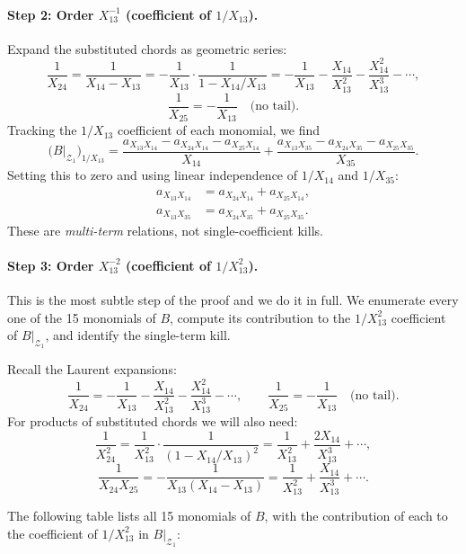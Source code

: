 \documentclass[11pt]{article}
\newcommand{\X}[2]{X_{#1#2}}
\newcommand{\Z}{\mathcal{Z}}
\theoremstyle{definition}
\begin{document}
\paragraph{Step 2: Order $\X{1}{3}^{-1}$ (coefficient of $1/\X{1}{3}$).}

Expand the substituted chords as geometric series:
\[
\frac{1}{\X{2}{4}}
=\frac{1}{\X{1}{4}-\X{1}{3}}
=-\frac{1}{\X{1}{3}}\cdot\frac{1}{1-\X{1}{4}/\X{1}{3}}
=-\frac{1}{\X{1}{3}}-\frac{\X{1}{4}}{\X{1}{3}^2}-\frac{\X{1}{4}^2}{\X{1}{3}^3}-\cdots,
\]
\[
\frac{1}{\X{2}{5}}=-\frac{1}{\X{1}{3}}\quad\text{(no tail).}
\]
Tracking the $1/\X{1}{3}$ coefficient of each monomial, we find
\[
\bigl(B|_{\Z_1}\bigr)_{1/\X{1}{3}}
=
\frac{a_{\X{1}{3}\X{1}{4}}-a_{\X{2}{4}\X{1}{4}}-a_{\X{2}{5}\X{1}{4}}}{\X{1}{4}}
+\frac{a_{\X{1}{3}\X{3}{5}}-a_{\X{2}{4}\X{3}{5}}-a_{\X{2}{5}\X{3}{5}}}{\X{3}{5}}.
\]
Setting this to zero and using linear independence of $1/\X{1}{4}$ and
$1/\X{3}{5}$:
\begin{align*}
a_{\X{1}{3}\X{1}{4}}&=a_{\X{2}{4}\X{1}{4}}+a_{\X{2}{5}\X{1}{4}},\\
a_{\X{1}{3}\X{3}{5}}&=a_{\X{2}{4}\X{3}{5}}+a_{\X{2}{5}\X{3}{5}}.
\end{align*}
These are \emph{multi-term} relations, not single-coefficient kills.

\paragraph{Step 3: Order $\X{1}{3}^{-2}$ (coefficient of $1/\X{1}{3}^2$).}

This is the most subtle step of the proof and we do it in full.
We enumerate every one of the 15 monomials of $B$, compute its contribution
to the $1/\X{1}{3}^2$ coefficient of $B|_{\Z_1}$, and identify the
single-term kill.

Recall the Laurent expansions:
\[
\frac{1}{\X{2}{4}}=-\frac{1}{\X{1}{3}}-\frac{\X{1}{4}}{\X{1}{3}^2}-\frac{\X{1}{4}^2}{\X{1}{3}^3}-\cdots,\qquad
\frac{1}{\X{2}{5}}=-\frac{1}{\X{1}{3}}\quad\text{(no tail)}.
\]
For products of substituted chords we will also need:
\[
\frac{1}{\X{2}{4}^2}=\frac{1}{\X{1}{3}^2}\cdot\frac{1}{(1-\X{1}{4}/\X{1}{3})^2}=\frac{1}{\X{1}{3}^2}+\frac{2\X{1}{4}}{\X{1}{3}^3}+\cdots,
\]
\[
\frac{1}{\X{2}{4}\X{2}{5}}=-\frac{1}{\X{1}{3}(\X{1}{4}-\X{1}{3})}=\frac{1}{\X{1}{3}^2}+\frac{\X{1}{4}}{\X{1}{3}^3}+\cdots.
\]

The following table lists all 15 monomials of $B$, with the contribution of
each to the coefficient of $1/\X{1}{3}^2$ in $B|_{\Z_1}$:
\end{document}
